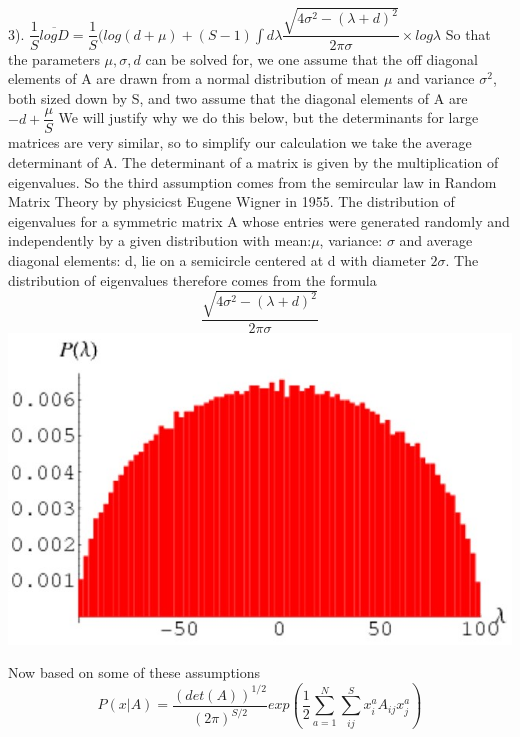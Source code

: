 \documentclass{article}
\begin{document}
3). $\dfrac{1}{S}\overline{logD}=\dfrac{1}{S}(log(d+\mu)+(S-1)\int d\lambda \dfrac{\sqrt{4\sigma^2-(\lambda+d)^2}}{2\pi\sigma}\times log\lambda$ \hfill\break\hfill\break
So that the parameters $\mu, \sigma, d$ can be solved for, we one assume that the off diagonal elements of A are drawn from a normal distribution of mean $\mu$ and variance $\sigma^2$, both sized down by S, and two assume that the diagonal elements of A are $-d+\dfrac{\mu}{S}$\hfill\break
We will justify why we do this below, but the determinants for large matrices are very similar, so to simplify our calculation we take the average determinant of A. The determinant of a matrix is given by the multiplication of eigenvalues. So the third assumption comes from the semircular law in Random Matrix Theory by physicicst Eugene Wigner in 1955. The distribution of eigenvalues for a symmetric matrix A whose entries were generated randomly and independently by a given distribution with mean:$ \mu$, variance: $\sigma$ and average diagonal elements: d, lie on a semicircle centered at d with diameter $2\sigma$. The distribution of eigenvalues therefore comes from the formula \hfill\break
$$
\dfrac{\sqrt{4\sigma^2-(\lambda+d)^2}}{2\pi\sigma}
$$
\hfill\break
\includegraphics[scale=0.5]{Picture2} \cite{one}

\hfill\break\hfill\break

Now based on some of these assumptions 
$$
P(x|A)=\dfrac{(det(A))^{1/2}}{(2\pi)^{S/2}} exp(\dfrac{1}{2}\sum_{a=1}^N\sum_{ij}^S x_i^aA_{ij}x_j^a)
$$
\end{document}
